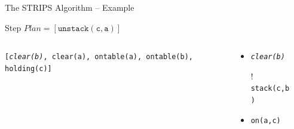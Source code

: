 \documentclass[presentation]{beamer}\mode<presentation>{\usetheme{AMSBolognaFC}}
\begin{document}
% 				


\begin{frame}[c]{The STRIPS Algorithm -- Example}
\small

	\begin{exampleblock}{Step \nextStripsExampleStep{} \hfill $Plan = [\mathtt{unstack(c,a)}]$}
		\begin{columns}[t]
			\begin{column}{.30\linewidth}\centering
				\alert{\texttt{[\emph{clear(b)}, clear(a), ontable(a), ontable(b), holding(c)]}}
			\end{column}
			\begin{column}{.50\linewidth}\centering
				\begin{itemize}
					\item \alert{\emph{\texttt{clear(b)}}}
					\item[!] \texttt{stack(c,b)}
					\item \texttt{on(a,c)}
				\end{itemize}
			\end{column}
			\begin{column}{.10\linewidth}\centering
				
			\end{column}
		\end{columns}
	\end{exampleblock}

\end{frame}
\end{document}
